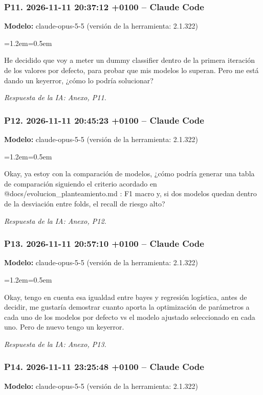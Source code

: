 \documentclass[11pt,a4paper]{article}
\newenvironment{prompt}
  {\par\smallskip\begin{list}{}{\leftmargin=1.2em\rightmargin=0.5em}\item\relax\small\color{black!80}}
  {\end{list}\smallskip}
\begin{document}
\subsubsection*{P11. 2026-11-11 20:37:12 +0100 -- Claude Code}
\textbf{Modelo:} claude-opus-5-5 (versión de la herramienta: 2.1.322)

\begin{prompt}
He decidido que voy a meter un dummy classifier dentro de la primera iteración de los valores por defecto, para probar que mis modelos lo superan. Pero me está dando un keyerror, ¿cómo lo podría solucionar?
\end{prompt}

\textit{Respuesta de la IA: Anexo, P11.}

\subsubsection*{P12. 2026-11-11 20:45:23 +0100 -- Claude Code}
\textbf{Modelo:} claude-opus-5-5 (versión de la herramienta: 2.1.322)

\begin{prompt}
Okay, ya estoy con la comparación de modelos, ¿cómo podría generar una tabla de comparación siguiendo el criterio acordado en @docs/\allowbreak{}evolucion\_\allowbreak{}planteamiento.md  : F1 macro y, si dos modelos quedan dentro de la desviación entre folds, el recall de riesgo alto?
\end{prompt}

\textit{Respuesta de la IA: Anexo, P12.}

\subsubsection*{P13. 2026-11-11 20:57:10 +0100 -- Claude Code}
\textbf{Modelo:} claude-opus-5-5 (versión de la herramienta: 2.1.322)

\begin{prompt}
Okay, tengo en cuenta esa igualdad entre bayes y regresión logística, antes de decidir, me gustaría demostrar cuanto aporta la optimización de parámetros a cada uno de los modelos por defecto vs el modelo ajustado seleccionado en cada uno. Pero de nuevo tengo un keyerror.
\end{prompt}

\textit{Respuesta de la IA: Anexo, P13.}

\subsubsection*{P14. 2026-11-11 23:25:48 +0100 -- Claude Code}
\textbf{Modelo:} claude-opus-5-5 (versión de la herramienta: 2.1.322)
\end{document}
